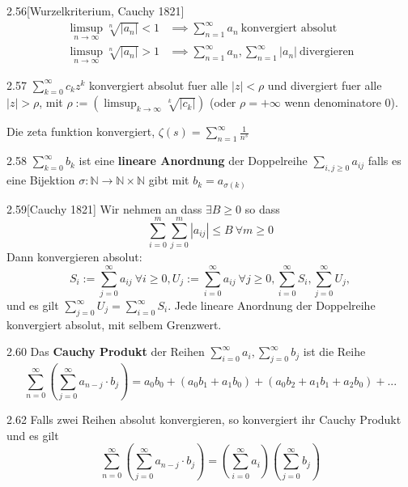 \documentclass[8pt,a4paper,twocolumn,table]{extarticle}
\newcommand{\N}{\mathbb{N}}
\begin{document}
\begin{satz}{2.56}[Wurzelkriterium, Cauchy 1821]
    \begin{align*}
        \limsup_{n \to \infty} \sqrt[n]{|a_n|} < 1 & \implies \sum_{n=1}^\infty a_n\ \mbox{konvergiert absolut}                  \\
        \limsup_{n \to \infty} \sqrt[n]{|a_n|} > 1 & \implies \sum_{n=1}^\infty a_n, \sum_{n=1}^\infty |a_n|\ \mbox{divergieren}
    \end{align*}
\end{satz}

\begin{korollar}{2.57}
    $\sum_{k=0}^\infty c_k z^k$ konvergiert absolut fuer alle $|z| < \rho$ und divergiert fuer alle $|z| > \rho$,
    mit $\rho := \left( \limsup_{k \to \infty} \sqrt[k]{|c_k|} \right)$ (oder $\rho = +\infty$ wenn denominatore 0).
\end{korollar}

\begin{korollar}{}
    Die zeta funktion konvergiert, $\zeta(s) = \sum_{n=1}^\infty \frac{1}{n^s}$
\end{korollar}

\begin{definition}{2.58}
    $\sum_{k=0}^\infty b_k$ ist eine \textbf{lineare Anordnung} der Doppelreihe $\sum_{i,j \ge 0} a_{ij}$ falls es
    eine Bijektion $\sigma : \N \to \N \times \N$ gibt mit $b_k = a_{\sigma(k)}$
\end{definition}

\begin{satz}{2.59}[Cauchy 1821]
    Wir nehmen an dass $\exists B \ge 0$ so dass
    \[ \sum_{i=0}^m \sum_{j=0}^m |a_{ij}| \le B\ \forall m \ge 0 \]
    Dann konvergieren absolut:
    \[
        S_i := \sum_{j=0}^\infty a_{ij}\ \forall i \ge 0,
        U_j := \sum_{i=0}^\infty a_{ij}\ \forall j \ge 0,
        \sum_{i=0}^\infty S_i,
        \sum_{j=0}^\infty U_j,
    \]
    und es gilt $\sum_{j=0}^\infty U_j = \sum_{i=0}^\infty S_i$.
    Jede lineare Anordnung der Doppelreihe konvergiert absolut, mit selbem Grenzwert.
\end{satz}

\begin{definition}{2.60}
    Das \textbf{Cauchy Produkt} der Reihen $\sum_{i=0}^\infty a_i, \sum_{j=0}^\infty b_j$
    ist die Reihe
    \[ \sum_{n=0}^\infty \left( \sum_{j=0}^\infty a_{n-j} \cdot b_j \right) = a_0b_0 + (a_0b_1 + a_1b_0) + (a_0b_2 + a_1b_1 + a_2b_0) + ... \]
\end{definition}
\begin{satz}{2.62}
    Falls zwei Reihen absolut konvergieren, so konvergiert ihr Cauchy Produkt und es gilt
    \[ \sum_{n=0}^\infty \left( \sum_{j=0}^\infty a_{n-j} \cdot b_j \right) = \left( \sum_{i=0}^\infty a_i \right) \left( \sum_{j=0}^\infty b_j \right)\]
\end{satz}
\end{document}
